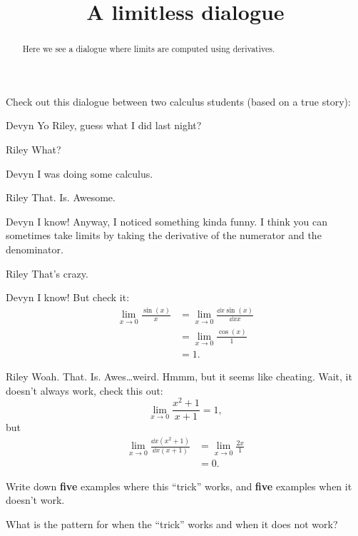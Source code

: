 \documentclass{ximera}
\title[Break-Ground:]{A limitless dialogue}
\begin{document}
\begin{abstract}
Here we see a dialogue where limits are computed using derivatives.
\end{abstract}
\maketitle

Check out this dialogue between two calculus students (based on a true
story):

\begin{dialogue}
\item[Devyn] Yo Riley, guess what I did last night?
\item[Riley] What?
\item[Devyn] I was doing some calculus.
\item[Riley] That. Is. Awesome.
\item[Devyn] I know! Anyway, I noticed something kinda funny. I
  think you can sometimes take limits by taking the derivative of the
  numerator and the denominator.
\item[Riley] That's crazy.
\item[Devyn] I know! But check it:
  \begin{align*}
    \lim_{x\to 0} \frac{\sin(x)}{x} &= \lim_{x\to 0} \frac{\dd{x}\sin(x)}{\dd{x}x}\\
    &= \lim_{x\to 0} \frac{\cos(x)}{1}\\
    &=1.
  \end{align*}
  \item[Riley] Woah. That. Is. Awes\dots weird. Hmmm, but it seems like
    cheating. Wait, it doesn't always work, check this out:
    \[
    \lim_{x\to 0} \frac{x^2+1}{x+1} = 1,
    \]
    but
    \begin{align*}
      \lim_{x\to 0} \frac{\dd{x}\left(x^2+1\right)}{\dd{x}\left(x+1\right)} &=
      \lim_{x\to 0} \frac{2x}{1} \\
      &=0.
    \end{align*}
\end{dialogue}

\begin{problem}
  Write down \textbf{five} examples where this ``trick'' works, and
  \textbf{five} examples when it doesn't work.
  \begin{freeResponse}
\end{freeResponse}
\end{problem}

\begin{problem}
  What is the pattern for when the ``trick'' works and when it does not work?
  \begin{freeResponse}
\end{freeResponse}
\end{problem}


\end{document}
